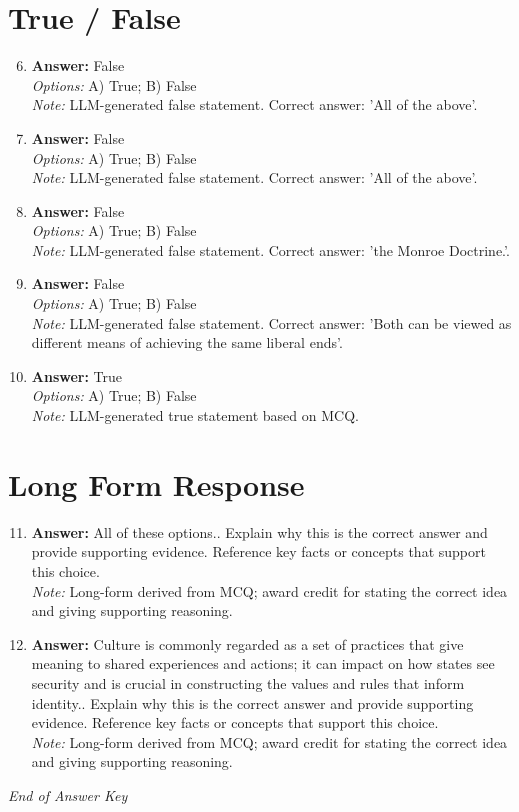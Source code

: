 \documentclass[12pt]{article}
\begin{document}
\section*{True / False}
\begin{enumerate}[label=\arabic*.]
\setcounter{enumi}{5}
\item \textbf{Answer:} False
\\ \textit{Options:} A) True; B) False
\\ \textit{Note:} LLM-generated false statement. Correct answer: 'All of the above'.
\item \textbf{Answer:} False
\\ \textit{Options:} A) True; B) False
\\ \textit{Note:} LLM-generated false statement. Correct answer: 'All of the above'.
\item \textbf{Answer:} False
\\ \textit{Options:} A) True; B) False
\\ \textit{Note:} LLM-generated false statement. Correct answer: 'the Monroe Doctrine.'.
\item \textbf{Answer:} False
\\ \textit{Options:} A) True; B) False
\\ \textit{Note:} LLM-generated false statement. Correct answer: 'Both can be viewed as different means of achieving the same liberal ends'.
\item \textbf{Answer:} True
\\ \textit{Options:} A) True; B) False
\\ \textit{Note:} LLM-generated true statement based on MCQ.
\end{enumerate}

\section*{Long Form Response}
\begin{enumerate}[label=\arabic*.]
\setcounter{enumi}{10}
\item \textbf{Answer:} All of these options.. Explain why this is the correct answer and provide supporting evidence. Reference key facts or concepts that support this choice.
\\ \textit{Note:} Long-form derived from MCQ; award credit for stating the correct idea and giving supporting reasoning.
\item \textbf{Answer:} Culture is commonly regarded as a set of practices that give meaning to shared experiences and actions; it can impact on how states see security and is crucial in constructing the values and rules that inform identity.. Explain why this is the correct answer and provide supporting evidence. Reference key facts or concepts that support this choice.
\\ \textit{Note:} Long-form derived from MCQ; award credit for stating the correct idea and giving supporting reasoning.
\end{enumerate}

\vfill
\noindent\textit{End of Answer Key}
\end{document}
